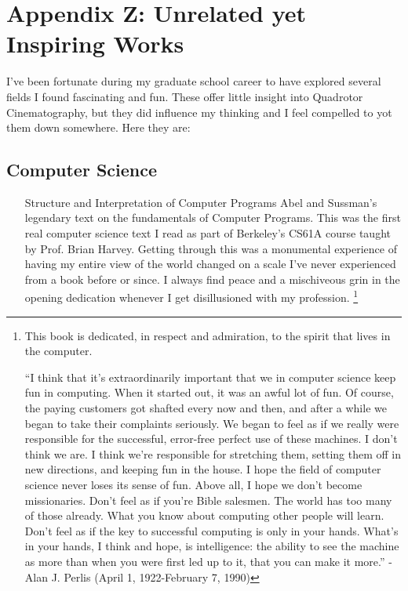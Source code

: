 \chapter{Appendix Z: Unrelated yet Inspiring Works}

I've been fortunate during my graduate school career to have explored several fields I found fascinating and fun. These offer little insight into Quadrotor Cinematography, but they did influence my thinking and I feel compelled to yot them down somewhere. Here they are:


\section{Computer Science}

\begin{itemize}

\item[Structure and Interpretation of Computer Programs] Abel and Sussman's legendary text on the fundamentals of Computer Programs. This was the first real computer science text I read as part of Berkeley's CS61A course taught by Prof. Brian Harvey. Getting through this was a monumental experience of having my entire view of the world changed on a scale I've never experienced from a book before or since. I always find peace and a mischiveous grin in the opening dedication whenever I get disillusioned with my profession. \footnote{This book is dedicated, in respect and admiration, to the spirit that lives in the computer.

``I think that it's extraordinarily important that we in computer science keep fun in computing. When it started out, it was an awful lot of fun. Of course, the paying customers got shafted every now and then, and after a while we began to take their complaints seriously. We began to feel as if we really were responsible for the successful, error-free perfect use of these machines. I don't think we are. I think we're responsible for stretching them, setting them off in new directions, and keeping fun in the house. I hope the field of computer science never loses its sense of fun. Above all, I hope we don't become missionaries. Don't feel as if you're Bible salesmen. The world has too many of those already. What you know about computing other people will learn. Don't feel as if the key to successful computing is only in your hands. What's in your hands, I think and hope, is intelligence: the ability to see the machine as more than when you were first led up to it, that you can make it more.'' -Alan J. Perlis (April 1, 1922-February 7, 1990)
}

\end{itemize}

